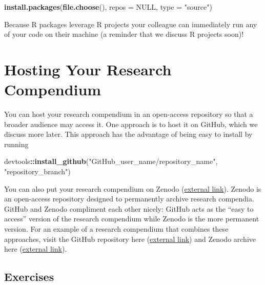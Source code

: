 \documentclass[
]{book}
\newenvironment{Shaded}{\begin{snugshade}}{\end{snugshade}}
\newcommand{\DataTypeTok}[1]{\textcolor[rgb]{0.13,0.29,0.53}{#1}}
\newcommand{\KeywordTok}[1]{\textcolor[rgb]{0.13,0.29,0.53}{\textbf{#1}}}
\newcommand{\NormalTok}[1]{#1}
\newcommand{\OperatorTok}[1]{\textcolor[rgb]{0.81,0.36,0.00}{\textbf{#1}}}
\newcommand{\OtherTok}[1]{\textcolor[rgb]{0.56,0.35,0.01}{#1}}
\newcommand{\StringTok}[1]{\textcolor[rgb]{0.31,0.60,0.02}{#1}}
\begin{document}
\begin{Shaded}
\begin{Highlighting}[]
\KeywordTok{install.packages}\NormalTok{(}\KeywordTok{file.choose}\NormalTok{(), }\DataTypeTok{repos =} \OtherTok{NULL}\NormalTok{, }\DataTypeTok{type =} \StringTok{"source"}\NormalTok{)}
\end{Highlighting}
\end{Shaded}

Because R packages leverage R projects your colleague can immediately run any of your code on their machine (a reminder that we discuss R projects soon)!

\hypertarget{hosting-your-research-compendium}{%
\section{Hosting Your Research Compendium}\label{hosting-your-research-compendium}}

You can host your research compendium in an open-access repository so that a broader audience may access it. One approach is to host it on GitHub, which we discuss more later. This approach has the advantage of being easy to install by running

\begin{Shaded}
\begin{Highlighting}[]
\NormalTok{devtools}\OperatorTok{::}\KeywordTok{install_github}\NormalTok{(}\StringTok{"GitHub_user_name/repository_name"}\NormalTok{, }\StringTok{"repository_branch"}\NormalTok{)}
\end{Highlighting}
\end{Shaded}

You can also put your research compendium on Zenodo (\href{https://zenodo.org/}{external link}). Zenodo is an open-access repository designed to permanently archive research compendia. GitHub and Zenodo compliment each other nicely: GitHub acts as the ``easy to access'' version of the research compendium while Zenodo is the more permanent version. For an example of a research compendium that combines these approaches, visit the GitHub repository here (\href{https://github.com/usepa/ri_wq_trends}{external link}) and Zenodo archive here (\href{https://zenodo.org/record/4306765\#.YUygPbhKhPY}{external link}).

\hypertarget{ex-set10}{%
\subsection{Exercises}\label{ex-set10}}
\end{document}
